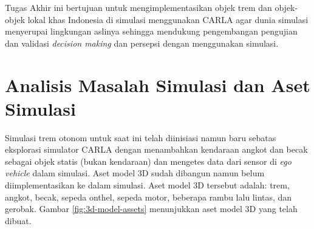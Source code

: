 Tugas Akhir ini bertujuan untuk mengimplementasikan objek trem dan objek-objek
lokal khas Indonesia di simulasi menggunakan CARLA agar dunia simulasi
menyerupai lingkungan aslinya sehingga mendukung pengembangan pengujian dan
validasi \textit{decision making} dan persepsi dengan menggunakan simulasi.

\section{Analisis Masalah Simulasi dan Aset Simulasi}

Simulasi trem otonom untuk saat ini telah diinisiasi namun baru sebatas
eksplorasi simulator CARLA dengan menambahkan kendaraan angkot dan becak sebagai
objek statis (bukan kendaraan) dan mengetes data dari sensor di \textit{ego
vehicle} dalam simulasi. Aset model 3D sudah dibangun namun belum
diimplementasikan ke dalam simulasi. Aset model 3D tersebut adalah: trem,
angkot, becak, sepeda onthel, sepeda motor, beberapa rambu lalu lintas, dan
gerobak. Gambar \ref{fig:3d-model-assets} menunjukkan aset model 3D yang telah
dibuat.

